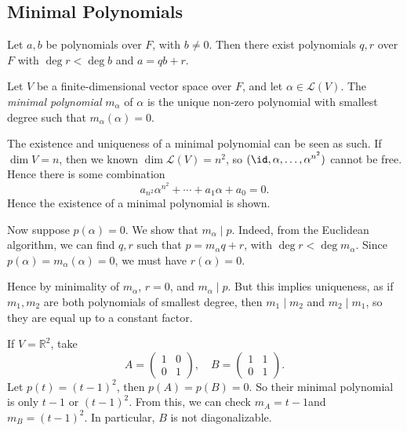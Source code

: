 \documentclass[12pt]{article}
\begin{document}
\subsection{Minimal Polynomials}%
\label{sub:minimal_polynomials}

\begin{proposition}
	Let $a, b$ be polynomials over $F$, with $b \neq 0$. Then there exist polynomials $q, r$ over $F$ with $\deg r < \deg b$ and $a = qb + r$.
\end{proposition}

\begin{definition}
	Let $V$ be a finite-dimensional vector space over $F$, and let $\alpha \in \mathcal{L}(V)$. The \textit{minimal polynomial} $m_{\alpha}$ of $\alpha$ is the unique non-zero polynomial with smallest degree such that $m_{\alpha}(\alpha) = 0$.
\end{definition}

The existence and uniqueness of a minimal polynomial can be seen as such. If $\dim V = n$, then we known $\dim \mathcal{L}(V) = n^2$, so $(\id, \alpha, \ldots, \alpha^{n^2})$ cannot be free. Hence there is some combination
\[
a_{n^2}\alpha^{n^2} + \cdots + a_1 \alpha + a_0 = 0
.\]
Hence the existence of a minimal polynomial is shown.

Now suppose $p(\alpha) = 0$. We show that $m_{\alpha} \mid p$. Indeed, from the Euclidean algorithm, we can find $q, r$ such that $p = m_{\alpha}q + r$, with $\deg r < \deg m_{\alpha}$. Since $p(\alpha) = m_{\alpha}(\alpha) = 0$, we must have $r(\alpha) = 0$.

Hence by minimality of $m_{\alpha}$, $r = 0$, and $m_{\alpha} \mid p$. But this implies uniqueness, as if $m_1, m_2$ are both polynomials of smallest degree, then $m_1 \mid m_2$ and $m_2 \mid m_1$, so they are equal up to a constant factor.

\begin{exbox}
	If $V = \mathbb{R}^2$, take
	\[
	A =
	\begin{pmatrix}
		1 & 0 \\
		0 & 1
	\end{pmatrix}
	, \quad B =
	\begin{pmatrix}
		1 & 1 \\
		0 & 1
	\end{pmatrix}
	.\]
	Let $p(t) = (t - 1)^2$, then $p(A) = p(B) = 0$. So their minimal polynomial is only $t - 1$ or $(t - 1)^2$. From this, we can check $m_{A} = t - 1$and $m_{B} = (t - 1)^2$. In particular, $B$ is not diagonalizable.
\end{exbox}
\end{document}
